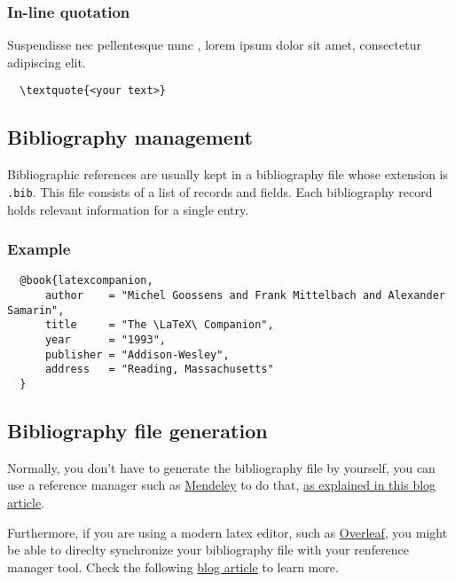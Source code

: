 \subsubsection{In-line quotation}

Suspendisse nec pellentesque nunc , lorem ipsum dolor sit amet, consectetur adipiscing elit.

\begin{lstlisting}
  \textquote{<your text>}
\end{lstlisting}

\subsection{Bibliography management}

Bibliographic references are usually kept in a bibliography file whose extension is \verb|.bib|. This file consists of a list of records and fields. Each bibliography record holds relevant information for a single entry.

\subsubsection{Example}

\begin{lstlisting}
  @book{latexcompanion,
      author    = "Michel Goossens and Frank Mittelbach and Alexander Samarin",
      title     = "The \LaTeX\ Companion",
      year      = "1993",
      publisher = "Addison-Wesley",
      address   = "Reading, Massachusetts"
  }
\end{lstlisting}

\subsection{Bibliography file generation}

Normally, you don't have to generate the bibliography file by yourself, you can use a reference manager such as \href{https://www.mendeley.com}{Mendeley} to do that, \href{https://blog.mendeley.com/2012/03/24/how-to-series-generate-bibtex-files-for-your-collections-for-use-in-latex-part-3-of-12/}{as explained in this blog article}.

Furthermore, if you are using a modern latex editor, such as \href{https://www.overleaf.com}{Overleaf}, you might be able to direclty synchronize your bibliography file with your renference manager tool. Check the following \href{https://www.overleaf.com/blog/639-tip-of-the-week-overleaf-and-reference-managers}{blog article} to learn more.

